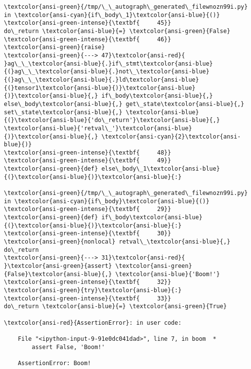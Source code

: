 \documentclass[11pt]{article}
\begin{document}
\begin{Verbatim}[commandchars=\\\{\}, frame=single, framerule=2mm, rulecolor=\color{outerrorbackground}]
\textcolor{ansi-green}{/tmp/\_\_autograph\_generated\_filewnozn99i.py} in \textcolor{ansi-cyan}{if\_body\_1}\textcolor{ansi-blue}{()}
\textcolor{ansi-green-intense}{\textbf{     45}}                             do\_return \textcolor{ansi-blue}{=} \textcolor{ansi-green}{False}
\textcolor{ansi-green-intense}{\textbf{     46}}                             \textcolor{ansi-green}{raise}
\textcolor{ansi-green}{---> 47}\textcolor{ansi-red}{                     }ag\_\_\textcolor{ansi-blue}{.}if\_stmt\textcolor{ansi-blue}{(}ag\_\_\textcolor{ansi-blue}{.}not\_\textcolor{ansi-blue}{(}ag\_\_\textcolor{ansi-blue}{.}ld\textcolor{ansi-blue}{(}tensor1\textcolor{ansi-blue}{)}\textcolor{ansi-blue}{)}\textcolor{ansi-blue}{,} if\_body\textcolor{ansi-blue}{,} else\_body\textcolor{ansi-blue}{,} get\_state\textcolor{ansi-blue}{,} set\_state\textcolor{ansi-blue}{,} \textcolor{ansi-blue}{(}\textcolor{ansi-blue}{'do\_return'}\textcolor{ansi-blue}{,} \textcolor{ansi-blue}{'retval\_'}\textcolor{ansi-blue}{)}\textcolor{ansi-blue}{,} \textcolor{ansi-cyan}{2}\textcolor{ansi-blue}{)}
\textcolor{ansi-green-intense}{\textbf{     48}} 
\textcolor{ansi-green-intense}{\textbf{     49}}                 \textcolor{ansi-green}{def} else\_body\_1\textcolor{ansi-blue}{(}\textcolor{ansi-blue}{)}\textcolor{ansi-blue}{:}

\textcolor{ansi-green}{/tmp/\_\_autograph\_generated\_filewnozn99i.py} in \textcolor{ansi-cyan}{if\_body}\textcolor{ansi-blue}{()}
\textcolor{ansi-green-intense}{\textbf{     29}}                     \textcolor{ansi-green}{def} if\_body\textcolor{ansi-blue}{(}\textcolor{ansi-blue}{)}\textcolor{ansi-blue}{:}
\textcolor{ansi-green-intense}{\textbf{     30}}                         \textcolor{ansi-green}{nonlocal} retval\_\textcolor{ansi-blue}{,} do\_return
\textcolor{ansi-green}{---> 31}\textcolor{ansi-red}{                         }\textcolor{ansi-green}{assert} \textcolor{ansi-green}{False}\textcolor{ansi-blue}{,} \textcolor{ansi-blue}{'Boom!'}
\textcolor{ansi-green-intense}{\textbf{     32}}                         \textcolor{ansi-green}{try}\textcolor{ansi-blue}{:}
\textcolor{ansi-green-intense}{\textbf{     33}}                             do\_return \textcolor{ansi-blue}{=} \textcolor{ansi-green}{True}

\textcolor{ansi-red}{AssertionError}: in user code:

    File "<ipython-input-9-91e0dc041dad>", line 7, in boom  *
        assert False, 'Boom!'

    AssertionError: Boom!

    \end{Verbatim}
\end{document}
